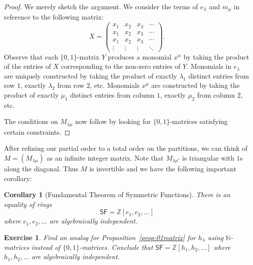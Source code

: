 \documentclass[12pt]{article}
\theoremstyle{plain}
\newtheorem{corollary}[theorem]{Corollary}
\newtheorem{exercise}[theorem]{Exercise}
\theoremstyle{definition}
\theoremstyle{remark}
\numberwithin{equation}{section}
\begin{document}
\begin{proof}
We merely sketch the argument.
We consider the terms of $e_\lambda$ and $m_\mu$ in reference to the
following matrix:
\[
X = \begin{pmatrix}
x_1 & x_2 & x_3 & \cdots \\
x_1 & x_2 & x_3 & \cdots \\
x_1 & x_2 & x_3 & \cdots \\
\vdots & \vdots & \vdots & \ddots
\end{pmatrix}.
\]
Observe that each $\{0,1\}$-matrix $Y$ produces a monomial $x^\alpha$
by taking the product of the entries of $X$ corresponding to the
non-zero entries of $Y$.
Monomials in $e_\lambda$ are uniquely constructed by
taking the product of exactly $\lambda_1$ distinct entries from row $1$,
exactly $\lambda_2$ from row $2$, etc.
Monomials $x^\mu$ are constructed by
taking the product of exactly $\mu_1$ distinct entries from column $1$,
exactly $\mu_2$ from column $2$, etc.

The conditions on $M_{\lambda\mu}$ now follow by looking for
$\{0,1\}$-matrices satisfying certain constraints.
\end{proof}

After refining our partial order to a total order
on the partitions, we can think of $M=\left(M_{\lambda\mu}\right)$ as
an infinite integer matrix.
Note that $M_{\lambda\mu'}$ is triangular with $1$s along the diagonal.
Thus $M$ is invertible and we have the following important corollary:

\begin{corollary}[Fundamental Theorem of Symmetric Functions]
There is an equality of rings
\[\mathsf{SF} = \mathbb{Z}[e_1,e_2,\ldots] \]
where $e_1,e_2,\ldots$ are algebraically independent.
\end{corollary}

\begin{exercise}
Find an analog for Proposition~\ref{prop:01matrix} for $h_\lambda$
using $\mathbb{N}$-matrices instead of $\{0,1\}$-matrices.
Conclude that 
$\mathsf{SF} = \mathbb{Z}[h_1,h_2,\ldots]$
where $h_1,h_2,\ldots$ are algebraically independent.
\end{exercise}


\end{document}

